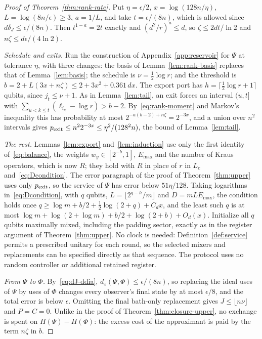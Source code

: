 \documentclass[11pt,a4paper]{article}
\theoremstyle{plain}
\theoremstyle{definition}
\theoremstyle{remark}
\newcommand{\ddia}{d_\diamond}
\begin{document}
\begin{proof}[Proof of Theorem~\ref{thm:rank-rate}]
Put $\eta=\epsilon/2$, $x=\log(128n/\eta)$, $L=\log(8n/\epsilon)\ge3$, $a=1/L$, and take $t=\epsilon/(8n)$, which is allowed since $d\delta_J\le\epsilon/(8n)$. Then
$t^{1-a}=2t$ exactly and $(d^2/r)^a\le d$, so $\zeta\le2dt/\ln2$ and $n\zeta\le d\epsilon/(4\ln2)$.

\emph{Schedule and exits.} Run the construction of Appendix~\ref{app:reservoir} for $\Psi$ at tolerance $\eta$, with three changes: the basis of
Lemma~\ref{lem:rank-basis} replaces that of Lemma~\ref{lem:basis}; the schedule is $\nu=\frac12\log r$; and the threshold is $b=2+L(3x+n\zeta)\le2+3x^2+0.361\,dx$.
The export port has $h=\lceil\frac12\log r+1\rceil$ qubits, since $j_t\le\nu+1$. As in Lemma~\ref{lem:tail}, an exit forces an interval $(u,t]$ with
$\sum_{u<k\le t}(\ell_{i_k}-\log r)>b-2$. By~\eqref{eq:rank-moment} and Markov's inequality this has probability at most $2^{-a(b-2)+n\zeta}=2^{-3x}$, and a union
over $n^2$ intervals gives $p_{\rm exit}\le n^22^{-3x}\le\eta^2/(128^2n)$, the bound of Lemma~\ref{lem:tail}.

\emph{The rest.} Lemmas~\ref{lem:export} and~\ref{lem:induction} use only the first identity of~\eqref{eq:balance}, the weights $w_y\in[2^{-b},1]$, $E_{\max}$ and
the number of Kraus operators, which is now $R$; they hold with $R$ in place of $r$ in $L_c$ and~\eqref{eq:Dcondition}. The error paragraph of the proof of
Theorem~\ref{thm:upper} uses only $p_{\rm exit}$, so the service of $\Psi$ has error below $51\eta/128$. Taking logarithms in~\eqref{eq:Dcondition}, with $q$ qubits,
$L=\lfloor2^{q-h}/m\rfloor$ and $D=mLE_{\max}$, the condition holds once $q\ge\log m+b/2+\frac12\log(2+q)+C_dx$, and the least such $q$ is at most
$\log m+\log(2+\log m)+b/2+\log(2+b)+O_d(x)$. Initialize all $q$ qubits maximally mixed, including the padding sector, exactly as in the register
argument of Theorem~\ref{thm:upper}. No clock is needed: Definition~\ref{def:service} permits a prescribed unitary for each round, so the selected
mixers and replacements can be specified directly as that sequence. The protocol uses no random controller or additional retained register.

\emph{From $\Psi$ to $\Phi$.} By~\eqref{eq:dJ-ddia}, $\ddia(\Psi,\Phi)\le\epsilon/(8n)$, so replacing the ideal uses of $\Psi$ by uses of $\Phi$ changes every observer's
final state by at most $\epsilon/8$, and the total error is below $\epsilon$. Omitting the final bath-only replacement gives
$J\le\lfloor n\nu\rfloor$ and $P=C=0$.
Unlike in the proof of Theorem~\ref{thm:closure-upper}, no exchange is spent on $H(\Psi)-H(\Phi)$: the excess cost
of the approximant is paid by the term $n\zeta$ in $b$.
\end{proof}
\end{document}
